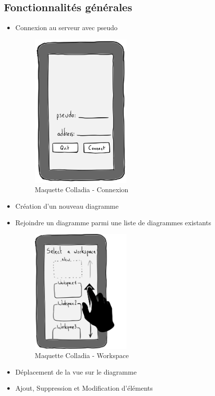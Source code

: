 \documentclass[a4paper,11pt]{article}
\begin{document}
\subsection{Fonctionnalités générales}
	\begin{itemize}
		\item Connexion au serveur avec pseudo
		\begin{figure}[h]
			\centering
			\includegraphics[width=5cm]{img/accueil.PNG}
			\caption{Maquette Colladia - Connexion}
		\end{figure}
		
		\item Création d'un nouveau diagramme
		\item Rejoindre un diagramme parmi une liste de diagrammes existants
		\begin{figure}[h]
			\centering
			\includegraphics[width=5cm]{img/workspace-selection.PNG}
			\caption{Maquette Colladia - Workspace}
		\end{figure}
		
		\item Déplacement de la vue sur le diagramme
		\item Ajout, Suppression et Modification d'éléments
	\end{itemize}
	
\end{document}
